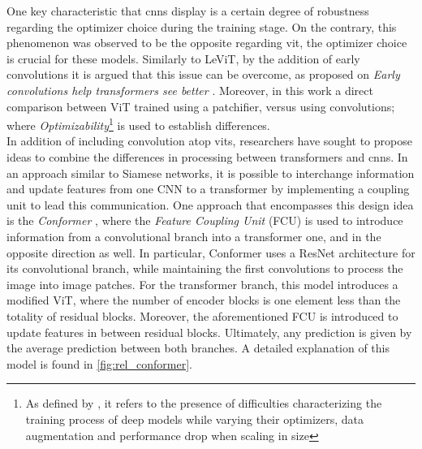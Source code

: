 \noindent One key characteristic that \glspl{cnn} display is a certain degree of robustness 
regarding the optimizer choice during the training stage. On the contrary, this phenomenon was 
observed to be the opposite regarding \gls{vit}, the optimizer choice is crucial for these 
models. Similarly to LeViT, by the addition of early convolutions it is argued that 
this issue can be overcome, as proposed on \emph{Early convolutions help transformers see 
better} \autocite{xiao2021early}. Moreover, in this work a direct comparison between ViT trained 
using a patchifier, versus using convolutions; where \emph{Optimizability}\footnote{As defined by 
\cite{xiao2021early}, it refers to the presence of difficulties characterizing the training 
process of deep models while varying their optimizers, data augmentation and performance drop 
when scaling in size} is used to establish differences.\\


\noindent In addition of including convolution atop \glspl{vit}, researchers have sought to propose 
ideas to combine the differences in processing between transformers and \glspl{cnn}. In an 
approach similar to Siamese networks, it is possible to interchange information and update 
features from one CNN to a transformer by implementing a coupling unit to lead this 
communication. One approach that encompasses this design idea is the \emph{Conformer} \autocite{
peng2021conformer}, where the \emph{Feature Coupling Unit} (FCU) is used to introduce information 
from a convolutional branch into a transformer one, and in the opposite direction as well. In 
particular, Conformer uses a ResNet architecture for its convolutional branch, while 
maintaining the first convolutions to process the image into image patches. For the transformer 
branch, this model introduces a modified ViT, where the number of encoder blocks is one element 
less than the totality of residual blocks. Moreover, the aforementioned FCU is introduced to update 
features in between residual blocks. Ultimately, any prediction is given by the average prediction 
between both branches. A detailed explanation of this model is found in \autoref{fig:rel_conformer}.